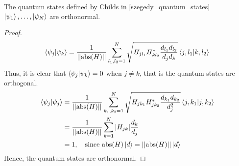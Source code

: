 \documentclass[
10pt, %
a4paper, %
oneside, %
headinclude,footinclude, %
BCOR5mm, %
]{scrartcl}
\begin{document}
\begin{theorem}\label{szegedy_quantum_states_orthonormal}
The quantum states defined by Childs in \ref{szegedy_quantum_states} $\ket{\psi_1},\ldots,\ket{\psi_N}$ are orthonormal.
\end{theorem}
\begin{proof}
$$\braket{\psi_j}{\psi_k}=\frac{1}{||\text{abs}(H)||}\sum_{l_1,l_2=1}^N\sqrt{H_{jl_1}H_{kl_2}^*\frac{d_{l_1}d_{l_2}}{d_jd_k}}\braket{j,l_1}{k,l_2}$$
Thus, it is clear that $\braket{\psi_j}{\psi_k}=0$ when $j\ne k$, that is the quantum states are orthogonal.
\begin{align*}
\centering
\braket{\psi_j}{\psi_j}&=\frac{1}{||\text{abs}(H)||}\sum_{k_1,k_2=1}^N\sqrt{H_{jk_1}H_{jk_2}^*\frac{d_{k_1}d_{k_2}}{d_j^2}}\braket{j,k_1}{j,k_2}\\
&=\frac{1}{||\text{abs}(H)||}\sum_{k=1}^N\abs{H_{jk}}\frac{d_k}{d_j}\\
&=1,\ \ \ \text{since }\text{abs}(H)\ket d=||\text{abs}(H)||\ket d
\end{align*}
Hence, the quantum states are orthonormal.
\end{proof}
\end{document}
